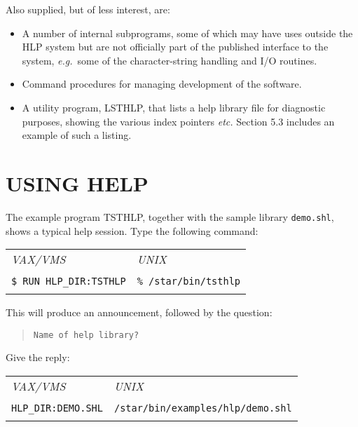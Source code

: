 \documentclass[11pt,nolof]{starlink}
\begin{document}
Also supplied, but of less interest, are:
\begin{itemize}
\item A number of internal subprograms, some of which may have uses outside
the HLP system but are not officially part of the published interface
to the system,
\textit{e.g.}\ some of the
character-string handling and I/O routines.
\item Command procedures for managing development of the software.
\item A utility program, LSTHLP, that lists a help library
file for diagnostic purposes, showing the various index pointers \textit{etc.}
Section 5.3 includes an example of such a listing.
\end{itemize}

\section{USING HELP}
The example program TSTHLP, together with the sample library \texttt{demo.shl},
shows a typical help session.
Type the following command:

\begin{tabular}{ll}
\\
\textit{VAX/VMS} & \textit{UNIX} \\ \\
\texttt{\$ RUN HLP\_DIR:TSTHLP} &\texttt{\% /star/bin/tsthlp} \\ \\
\end{tabular}

This will produce an announcement, followed by the question:
\begin{verse}
\texttt{Name of help library?}
\end{verse}
Give the reply:

\begin{tabular}{ll}
\\
\textit{VAX/VMS} & \textit{UNIX} \\ \\
\texttt{HLP\_DIR:DEMO.SHL} & \texttt{/star/bin/examples/hlp/demo.shl} \\ \\
\end{tabular}
\end{document}
